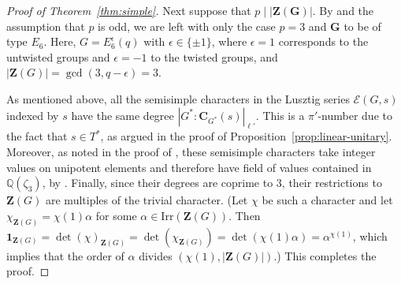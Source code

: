 \documentclass[12pt]{amsart}
\theoremstyle{definition}
\numberwithin{equation}{section}
\newcommand{\Irr}{{\mathrm {Irr}}}
\newcommand{\QQ}{{\mathbb Q}}
\newcommand{\EC}{\mathcal{E}}
\newcommand{\bC}{{\mathbf{C}}}
\newcommand{\bG}{{\mathbf{G}}}
\newcommand{\bZ}{{\mathbf{Z}}}
\begin{document}
\begin{proof}[Proof of Theorem~\ref{thm:simple}]
Next suppose that $p\mid |\bZ(\bG)|$. By
\cite[Theorem~1.12.5]{GLS98} and the assumption that $p$ is odd, we
are left with only the %
case $p=3$ and %
$\bG$ to be of type $E_6$.
Here, %
$G=E_6^\epsilon(q)$ with %
$\epsilon\in\{\pm1\}$, where %
$\epsilon=1$ corresponds %
to the untwisted groups %
and $\epsilon=-1$
to %
the twisted groups, and $|\bZ(G)|=\gcd(3,q-\epsilon)=3$.

As mentioned above, all the semisimple characters in the Lusztig
series $\EC(G,s)$ indexed by $s$ have the same degree
$|G^*:\bC_{G^*}(s)|_{\ell'}$. This is a $\pi'$-number due to the
fact that %
$s\in T^*$, as %
argued in the proof of
Proposition~\ref{prop:linear-unitary}. Moreover, as noted in the
proof of \cite[Proposition~4.5]{GHSV21}, these semisimple characters
take integer values on unipotent elements and therefore have field
of values contained in $\QQ(\zeta_3)$, by \cite[Lemma~4.3]{GHSV21}.
Finally, since their degrees are coprime to $3$, their restrictions
to $\bZ(G)$ are %
multiples of the trivial character. (Let $\chi$ be
such a character and %
let $\chi_{\bZ(G)}=\chi(1)\alpha$ for %
some
$\alpha\in\Irr(\bZ(G))$. %
Then
$\mathbf{1}_{\bZ(G)}=\det(\chi)_{\bZ(G)}=\det(\chi_{\bZ(G)})=\det(\chi(1)\alpha)=\alpha^{\chi(1)}$,
which %
implies that the order of $\alpha$ divides
$(\chi(1),|\bZ(G)|)$.) This completes the proof.
\end{proof}
\end{document}
